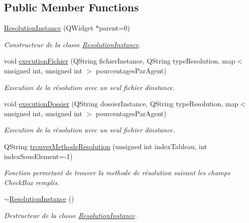 \subsection*{Public Member Functions}
\begin{DoxyCompactItemize}
\item 
\hyperlink{classResolutionInstance_a90e1ee7d8245bed88624a159b00cb6a7}{Resolution\+Instance} (Q\+Widget $\ast$parent=0)
\begin{DoxyCompactList}\small\item\em Constructeur de la classe \hyperlink{classResolutionInstance}{Resolution\+Instance}. \end{DoxyCompactList}\item 
void \hyperlink{classResolutionInstance_a1b922870d569b5a6056c4fb2543ec3d6}{execution\+Fichier} (Q\+String fichier\+Instance, Q\+String type\+Resolution, map$<$ unsigned int, unsigned int $>$ pourcentages\+Par\+Agent)
\begin{DoxyCompactList}\small\item\em Execution de la résolution avec un seul fichier d\textquotesingle{}instance. \end{DoxyCompactList}\item 
void \hyperlink{classResolutionInstance_a741ee2ea81859379e1418974029f9699}{execution\+Dossier} (Q\+String dossier\+Instance, Q\+String type\+Resolution, map$<$ unsigned int, unsigned int $>$ pourcentages\+Par\+Agent)
\begin{DoxyCompactList}\small\item\em Execution de la résolution avec un seul fichier d\textquotesingle{}instance. \end{DoxyCompactList}\item 
Q\+String \hyperlink{classResolutionInstance_a9545313b4dd11145de55fa89fd4a7e88}{trouver\+Methode\+Resolution} (unsigned int index\+Tableau, int index\+Sous\+Element=-\/1)
\begin{DoxyCompactList}\small\item\em Fonction permetant de trouver la methode de résolution suivant les champs Check\+Box remplis. \end{DoxyCompactList}\item 
\hyperlink{classResolutionInstance_acbc867c1e869aafcb0c20a5698e00aee}{$\sim$\+Resolution\+Instance} ()
\begin{DoxyCompactList}\small\item\em Destructeur de la classe \hyperlink{classResolutionInstance}{Resolution\+Instance}. \end{DoxyCompactList}\end{DoxyCompactItemize}


